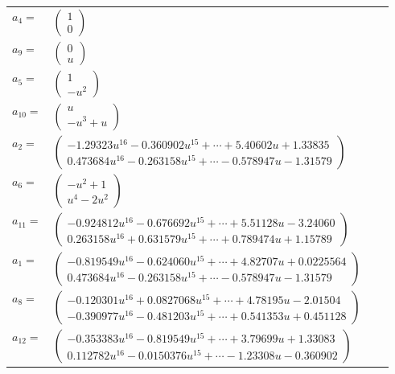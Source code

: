 \documentclass[1p]{elsarticle_modified}
\theoremstyle{definition}
\begin{document}
\begin{tabular}{m{7pt} m{180pt} m{7pt} m{180pt} }
\flushright $a_{4}=$&$\begin{pmatrix}1\\0\end{pmatrix}$ \\
\flushright $a_{9}=$&$\begin{pmatrix}0\\u\end{pmatrix}$ \\
\flushright $a_{5}=$&$\begin{pmatrix}1\\- u^2\end{pmatrix}$ \\
\flushright $a_{10}=$&$\begin{pmatrix}u\\- u^3+u\end{pmatrix}$ \\
\flushright $a_{2}=$&$\begin{pmatrix}-1.29323 u^{16}-0.360902 u^{15}+\cdots+5.40602 u+1.33835\\0.473684 u^{16}-0.263158 u^{15}+\cdots-0.578947 u-1.31579\end{pmatrix}$ \\
\flushright $a_{6}=$&$\begin{pmatrix}- u^2+1\\u^4-2 u^2\end{pmatrix}$ \\
\flushright $a_{11}=$&$\begin{pmatrix}-0.924812 u^{16}-0.676692 u^{15}+\cdots+5.51128 u-3.24060\\0.263158 u^{16}+0.631579 u^{15}+\cdots+0.789474 u+1.15789\end{pmatrix}$ \\
\flushright $a_{1}=$&$\begin{pmatrix}-0.819549 u^{16}-0.624060 u^{15}+\cdots+4.82707 u+0.0225564\\0.473684 u^{16}-0.263158 u^{15}+\cdots-0.578947 u-1.31579\end{pmatrix}$ \\
\flushright $a_{8}=$&$\begin{pmatrix}-0.120301 u^{16}+0.0827068 u^{15}+\cdots+4.78195 u-2.01504\\-0.390977 u^{16}-0.481203 u^{15}+\cdots+0.541353 u+0.451128\end{pmatrix}$ \\
\flushright $a_{12}=$&$\begin{pmatrix}-0.353383 u^{16}-0.819549 u^{15}+\cdots+3.79699 u+1.33083\\0.112782 u^{16}-0.0150376 u^{15}+\cdots-1.23308 u-0.360902\end{pmatrix}$ \\

\end{tabular}
\end{document}
